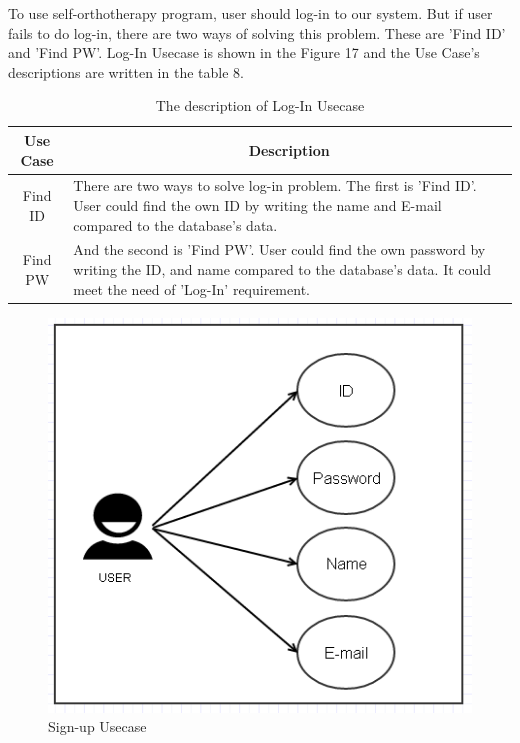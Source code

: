 \documentclass[conference]{IEEEtran}
\begin{document}
To use self-orthotherapy program, user should log-in to our system. But if user fails to do log-in, there are two ways of solving this problem. These are 'Find ID' and 'Find PW'. Log-In Usecase is shown in the Figure 17 and the Use Case's descriptions are written in the table 8.  




\begin{table}[h]
{\renewcommand\arraystretch{1.25}
\caption{The description of Log-In Usecase}
\begin{tabular}{|c|l|l|} \hline
Use Case & \multicolumn{2}{c|}{Description} \\ \hline\hline
Find ID& \multicolumn{2}{p{6.75cm}|}{\raggedright There are two ways to solve log-in problem. The first is 'Find ID'. User could find the own ID by writing the name and E-mail compared to the database's data.} \\ \hline
Find PW& \multicolumn{2}{p{6.75cm}|}{\raggedright And the second is 'Find PW'. User could find the own password by writing the ID, and name compared to the database's data. It could meet the need of 'Log-In' requirement.} \\ \hline
\end{tabular}}
\end{table}


\begin{figure}[H]
\begin{center}
    \includegraphics[scale=0.7]{img_19.png}
    \caption{Sign-up Usecase} 
\end{center}
\end{figure}
 		  
\end{document}
